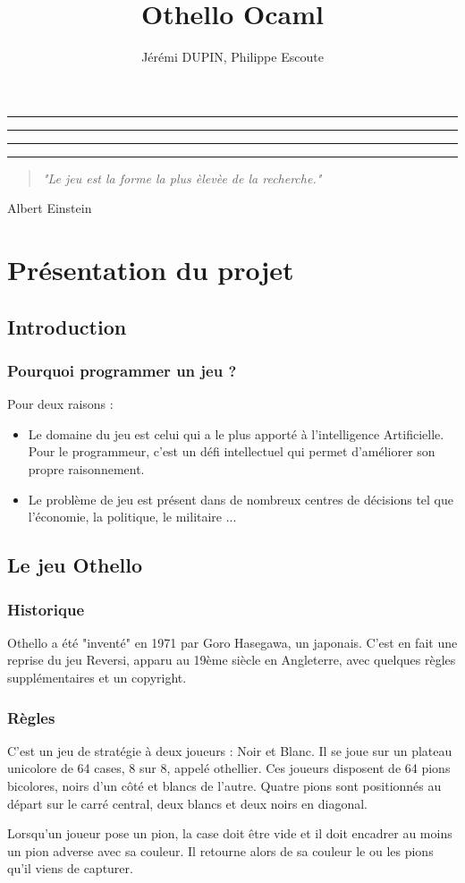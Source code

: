 \documentclass[10pt,a4paper]{report}
\author{Jérémi DUPIN, Philippe Escoute}
\title{Othello Ocaml}
\makeatletter
\renewcommand{\maketitle}{\begin{titlepage}%
    \let\footnotesize\small
    \let\footnoterule\relax
    \parindent \z@
    \reset@font
    \null
    \vskip 50\p@
    \begin{center}
      \hrule
      \vskip 1pt 
      \hrule
      \vskip 1pt
      {\huge \bfseries \strut \@title \strut}\par
      \vskip 1pt
      \hrule
      \vskip 1pt
      \hrule
    \end{center}
    \vskip 50\p@ 
    \begin{center}
      \Large \@author \par
    \end{center}
    \vskip 30\p@
    \begin{center}
      \Large \@date \par
    \end{center}
    \vskip 180 \p@
    \begin{center}
    	\begin{quote}
    		\textit{"Le jeu est la forme la plus \`{e}lev\`{e}e de la recherche."}
    	\end{quote}
    \end{center}
    \begin{flushright}
    Albert Einstein
    \end{flushright}
    \vfil
    \null
  \end{titlepage}%
  \setcounter{footnote}{0}%
}
\makeatother
\begin{document}
\maketitle
\chapter{Présentation du projet}
\section{Introduction}
\subsection*{Pourquoi programmer un jeu ?}
Pour deux raisons :
\begin{itemize}
\item Le domaine du jeu est celui qui a le plus apporté à l'intelligence Artificielle. Pour le programmeur, c'est un défi intellectuel qui permet d'améliorer son propre raisonnement.
\item Le problème de jeu est présent dans de nombreux centres de décisions tel que l'économie, la politique, le militaire ...
\end{itemize}

\section{Le jeu Othello}
\subsection*{Historique}
Othello a été "inventé" en 1971 par Goro Hasegawa, un japonais. C'est en fait une reprise du jeu Reversi, apparu au 19ème siècle en Angleterre, avec quelques règles supplémentaires et un copyright.
\subsection*{Règles}
C'est un jeu de stratégie à deux joueurs : Noir et Blanc. Il se joue sur un plateau unicolore de 64 cases, 8 sur 8, appelé othellier. Ces joueurs disposent de 64 pions bicolores, noirs d'un côté et blancs de l'autre. Quatre pions sont positionnés au départ sur le carré central, deux blancs et deux noirs en diagonal.

Lorsqu'un joueur pose un pion, la case doit être vide et il doit encadrer au moins un pion adverse avec sa couleur. Il retourne alors de sa couleur le ou les pions qu'il viens de capturer.
\end{document}
